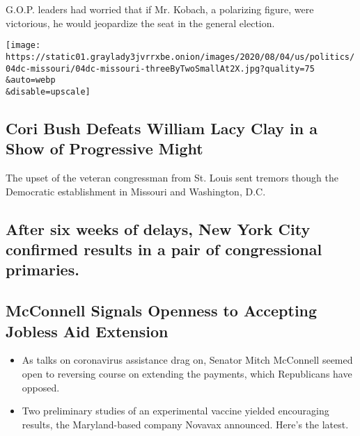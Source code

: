 G.O.P. leaders had worried that if Mr. Kobach, a polarizing figure, were
victorious, he would jeopardize the seat in the general election.

\href{/2020/08/05/us/politics/cori-bush-missouri-william-lacy-clay.html}{}

\texttt{[image: https://static01.graylady3jvrrxbe.onion/images/2020/08/04/us/politics/04dc-missouri/04dc-missouri-threeByTwoSmallAt2X.jpg?quality=75\\\&auto=webp\\\&disable=upscale]}

\href{/2020/08/05/us/politics/cori-bush-missouri-william-lacy-clay.html}{}

\hypertarget{cori-bush-defeats-william-lacy-clay-in-a-show-of-progressive-might}{%
\subsection{Cori Bush Defeats William Lacy Clay in a Show of Progressive
Might}\label{cori-bush-defeats-william-lacy-clay-in-a-show-of-progressive-might}}

The upset of the veteran congressman from St. Louis sent tremors though
the Democratic establishment in Missouri and Washington, D.C.

\href{/2020/08/04/nyregion/maloney-torres-ny-congressional-races.html}{}

\hypertarget{after-six-weeks-of-delays-new-york-city-confirmed-results-in-a-pair-of-congressional-primaries}{%
\subsection{After six weeks of delays, New York City confirmed results
in a pair of congressional
primaries.}\label{after-six-weeks-of-delays-new-york-city-confirmed-results-in-a-pair-of-congressional-primaries}}

\href{/2020/08/04/world/coronavirus-cases.html}{}

\hypertarget{mcconnell-signals-openness-to-accepting-jobless-aid-extension}{%
\subsection{McConnell Signals Openness to Accepting Jobless Aid
Extension}\label{mcconnell-signals-openness-to-accepting-jobless-aid-extension}}

\begin{itemize}
\tightlist
\item
  As talks on coronavirus assistance drag on, Senator Mitch McConnell
  seemed open to reversing course on extending the payments, which
  Republicans have opposed.
\item
  Two preliminary studies of an experimental vaccine yielded encouraging
  results, the Maryland-based company Novavax announced. Here's the
  latest.
\end{itemize}

